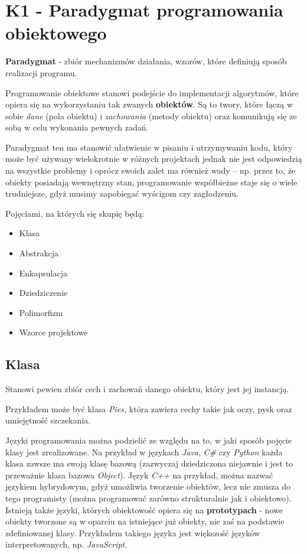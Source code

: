 \section{K1 - Paradygmat programowania obiektowego}

\textbf{Paradygmat} - zbiór mechanizmów działania, wzorów, które definiują sposób realizacji programu.

Programowanie obiektowe stanowi podejście do implementacji algorytmów, które opiera się na wykorzystaniu tak zwanych \textbf{obiektów}. Są to twory, które łączą w sobie \textit{dane} (pola obiektu) i \textit{zachowania} (metody obiektu) oraz komunikują się ze sobą w celu wykonania pewnych zadań.

Paradygmat ten ma stanowić ułatwienie w pisaniu i utrzymywaniu kodu, który może być używany wielokrotnie w różnych projektach jednak nie jest odpowiedzią na wszystkie problemy i oprócz swoich zalet ma również wady -- np. przez to, że obiekty posiadają wewnętrzny stan, programowanie współbieżne staje się o wiele trudniejsze, gdyż musimy zapobiegać wyścigom czy zagłodzeniu.

Pojęciami, na których się skupię będą:
\begin{itemize}
	\item Klasa
	\item Abstrakcja
	\item Enkapsulacja
	\item Dziedziczenie
	\item Polimorfizm
	\item Wzorce projektowe
\end{itemize}

\subsection{Klasa}
Stanowi pewien zbiór cech i zachowań danego obiektu, który jest jej instancją.

Przykładem może być klasa \textit{Pies,} która zawiera cechy takie jak oczy, pysk oraz umiejętność szczekania.

Języki programowania można podzielić ze względu na to, w jaki sposób pojęcie klasy jest zrealizowane. Na przykład w językach \textit{Java}, \textit{C\#} czy \textit{Python} każda klasa zawsze ma swoją klasę bazową (zazwyczaj dziedziczona niejawnie i jest to przeważnie klasa bazowa \textit{Object}). Język \textit{C++} na przykład, można nazwać językiem hybrydowym, gdyż umożliwia tworzenie obiektów, lecz nie zmusza do tego programisty (można programować zarówno strukturalnie jak i obiektowo). Istnieją także języki, których obiektowość opiera się na \textbf{prototypach} - nowe obiekty tworzone są w oparciu na istniejące już obiekty, nie zaś na podstawie zdefiniowanej klasy. Przykładem takiego języka jest większość języków interpretowanych, np. \textit{JavaScript}.

